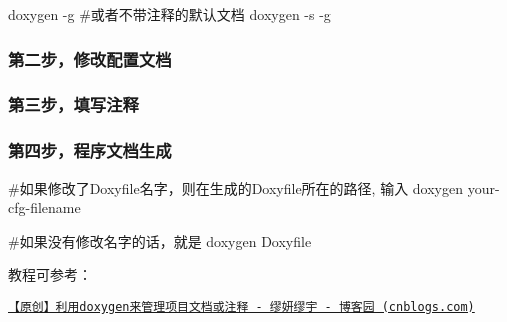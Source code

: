 
\begin{DoxyCode}
doxygen -g
#或者不带注释的默认文档
doxygen -s -g
\end{DoxyCode}


\subsubsection*{第二步，修改配置文档}

\subsubsection*{第三步，填写注释}

\subsubsection*{第四步，程序文档生成}


\begin{DoxyCode}
#如果修改了Doxyfile名字，则在生成的Doxyfile所在的路径, 输入
doxygen your-cfg-filename

#如果没有修改名字的话，就是
doxygen Doxyfile
\end{DoxyCode}


教程可参考：

\href{https://www.cnblogs.com/miaoshiqian/p/4109137.html}{\tt 【原创】利用doxygen来管理项目文档或注释 -\/ 缪妍缪宇 -\/ 博客园 (cnblogs.\+com)} 